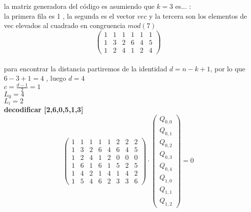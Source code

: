 \documentclass[10pt,a4paper]{article} %
\begin{document}
    la matriz generadora del código es asumiendo que $k = 3$ es... :
    \\
    la primera fila es 1 , la segunda es el vector $vec$ y la tercera son los
    elementos de vec elevados al cuadrado en congruencia $mod(7)$
    \begin{equation}
        \begin{pmatrix}
            1 & 1 & 1 & 1 & 1 & 1
            \\
            1 & 3 & 2 & 6 & 4 & 5
            \\
            1 & 2 & 4 & 1 & 2 & 4
        \end{pmatrix}
    \end{equation}
    \\
    para encontrar la distancia partiremos de la identidad $d = n-k +1$, por lo
    que $6-3+1 = 4$ , luego $d = 4$
    \\
    $c = \frac{d-1}{2} = 1$
    \\
    $L_0 = 4$
    \\
    $L_i = 2$
    \\
    \textbf{decodificar [2,6,0,5,1,3]}
    \begin{equation}
        \begin{pmatrix}
            1 & 1 & 1 & 1 & 1 & 2 & 2 & 2
            \\
            1 & 3 & 2 & 6 & 4 & 6 & 4 & 5
            \\
            1 & 2 & 4 & 1 & 2 & 0 & 0 & 0
            \\
            1 & 6 & 1 & 6 & 1 & 5 & 2 & 5
            \\
            1 & 4 & 2 & 1 & 4 & 1 & 4 & 2
            \\
            1 & 5 & 4 & 6 & 2 & 3 & 3 & 6
        \end{pmatrix}
        \cdot
        \begin{pmatrix}
          Q_{0,0}
          \\
          Q_{0,1}
          \\
          Q_{0,2}
          \\
          Q_{0,3}
          \\
          Q_{0,4}
          \\
          Q_{1,0}
          \\
          Q_{1,1}
          \\
          Q_{1,2}
        \end{pmatrix}
        = 0
    \end{equation}
\end{document}
